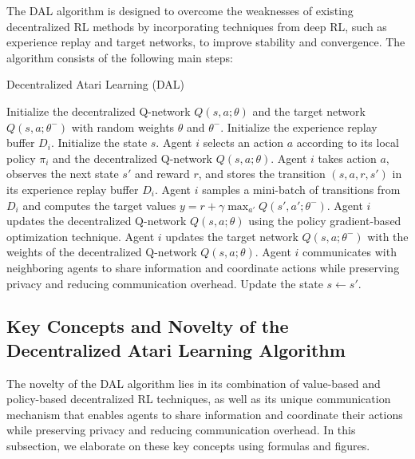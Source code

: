 The DAL algorithm is designed to overcome the weaknesses of existing decentralized RL methods by incorporating techniques from deep RL, such as experience replay and target networks, to improve stability and convergence. The algorithm consists of the following main steps:

\begin{algorithm}[h]
\caption{Decentralized Atari Learning (DAL)}
\begin{algorithmic}[1]
\STATE Initialize the decentralized Q-network $Q(s, a; \theta)$ and the target network $Q(s, a; \theta^-)$ with random weights $\theta$ and $\theta^-$.
    \STATE Initialize the experience replay buffer $D_i$.
        \STATE Initialize the state $s$.
            \STATE Agent $i$ selects an action $a$ according to its local policy $\pi_i$ and the decentralized Q-network $Q(s, a; \theta)$.
            \STATE Agent $i$ takes action $a$, observes the next state $s'$ and reward $r$, and stores the transition $(s, a, r, s')$ in its experience replay buffer $D_i$.
            \STATE Agent $i$ samples a mini-batch of transitions from $D_i$ and computes the target values $y = r + \gamma \max_{a'} Q(s', a'; \theta^-)$.
            \STATE Agent $i$ updates the decentralized Q-network $Q(s, a; \theta)$ using the policy gradient-based optimization technique.
            \STATE Agent $i$ updates the target network $Q(s, a; \theta^-)$ with the weights of the decentralized Q-network $Q(s, a; \theta)$.
            \STATE Agent $i$ communicates with neighboring agents to share information and coordinate actions while preserving privacy and reducing communication overhead.
            \STATE Update the state $s \leftarrow s'$.
        \ENDFOR
    \ENDFOR
\ENDFOR
\end{algorithmic}
\end{algorithm}

\subsection{Key Concepts and Novelty of the Decentralized Atari Learning Algorithm}

The novelty of the DAL algorithm lies in its combination of value-based and policy-based decentralized RL techniques, as well as its unique communication mechanism that enables agents to share information and coordinate their actions while preserving privacy and reducing communication overhead. In this subsection, we elaborate on these key concepts using formulas and figures.

